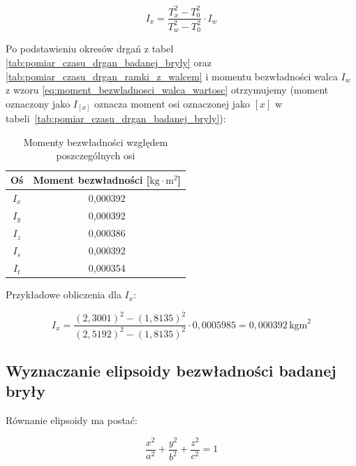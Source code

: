 \documentclass[a4paper,12pt]{article}
\begin{document}
\begin{equation} \label{eq:moment_bezwladnosci_badanej_bryly}
    I_x = \frac{T_x^2 - T_0^2}{T_w^2 - T_0^2} \cdot I_w
\end{equation}

Po podstawieniu okresów drgań z tabel \ref{tab:pomiar_czasu_drgan_badanej_bryly} oraz \ref{tab:pomiar_czasu_drgan_ramki_z_walcem} i momentu bezwładności walca $I_w$ z wzoru \eqref{eq:moment_bezwladnosci_walca_wartosc} otrzymujemy (moment oznaczony jako $I_{[x]}$ oznacza moment osi oznaczonej jako $[x]$ w tabeli~\ref{tab:pomiar_czasu_drgan_badanej_bryly}):

\begin{table}[H]
    \centering
    \begin{tabular}{|c|c|}
        \hline
        Oś & Moment bezwładności [$\text{kg}\cdot\text{m}^2$] \\
        \hline
        $I_x$ & 0,000392 \\
        $I_y$ & 0,000392 \\
        $I_z$ & 0,000386 \\
        $I_s$ & 0,000392 \\
        $I_t$ & 0,000354 \\
        \hline
    \end{tabular}
    \caption{Momenty bezwładności względem poszczególnych osi}
    \label{tab:momenty_bezwladnosci}
\end{table}

Przykładowe obliczenia dla $I_x$:

\begin{equation*}
    I_x = \frac{(2,3001)^2 - (1,8135)^2}{(2,5192)^2 - (1,8135)^2} \cdot 0,0005985 = 0,000392\,\text{kgm}^2
\end{equation*}



\subsection{Wyznaczanie elipsoidy bezwładności badanej bryły}


Równanie elipsoidy ma postać:

\begin{equation} \label{eq:elipsoida_bezwladnosci}
    \frac{x^2}{a^2} + \frac{y^2}{b^2} + \frac{z^2}{c^2} = 1
\end{equation}
\end{document}
